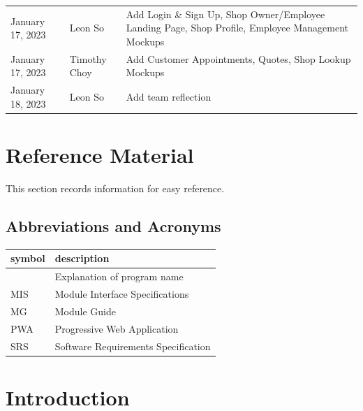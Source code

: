 \documentclass[12pt, titlepage]{article}
\begin{document}
\begin{table}[hp]
\begin{tabularx}{\textwidth}{llX}
		January 17, 2023  & Leon So               & Add Login \& Sign Up, Shop Owner/Employee Landing Page, Shop Profile, Employee Management Mockups \\
		January 17, 2023  & Timothy Choy          & Add Customer Appointments, Quotes, Shop Lookup Mockups                                            \\
		January 18, 2023  & Leon So               & Add team reflection                                                                               \\
		\bottomrule
	\end{tabularx}
\end{table}

\newpage

\section{Reference Material}

This section records information for easy reference.

\subsection{Abbreviations and Acronyms}

\begin{tabular}{l l}
	\toprule
	\textbf{symbol} & \textbf{description}                \\
	\midrule
	\progname       & Explanation of program name         \\
	MIS             & Module Interface Specifications     \\
	MG              & Module Guide                        \\
	PWA             & Progressive Web Application         \\
	SRS             & Software Requirements Specification \\
	\bottomrule
\end{tabular}

\newpage

\tableofcontents

\newpage

\listoftables

\listoffigures

\newpage


\section{Introduction}
\end{document}
